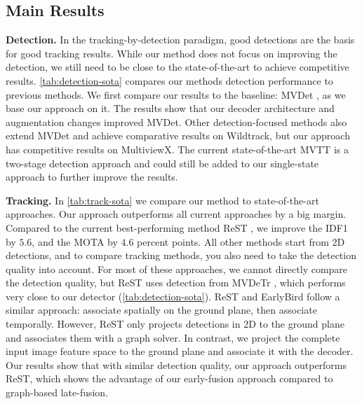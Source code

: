 \documentclass[10pt,twocolumn,letterpaper]{article}
\newcommand{\nparagraph}[1]{\noindent\textbf{#1.  }}
\def\sname{EarlyBird\xspace}
\begin{document}
\subsection{Main Results}

\nparagraph{Detection} In the tracking-by-detection paradigm, good detections are the basis for good tracking results. While our method does not focus on improving the detection, we still need to be close to the state-of-the-art to achieve competitive results. \cref{tab:detection-sota} compares our methods detection performance to previous methods. We first compare our results to the baseline: MVDet \cite{hou2020multiview}, as we base our approach on it. The results show that our decoder architecture and augmentation changes improved MVDet. Other detection-focused methods \cite{hou2021multiview, lee2023multi, song2021stacked} also extend MVDet and achieve comparative results on Wildtrack, but our approach has competitive results on MultiviewX. The current state-of-the-art MVTT \cite{lee2023multi} is a two-stage detection approach and could still be added to our single-state approach to further improve the results.

\nparagraph{Tracking} In \cref{tab:track-sota} we compare our method to state-of-the-art approaches. Our approach outperforms all current approaches by a big margin. Compared to the current best-performing method ReST \cite{cheng2023rest}, we improve the IDF1 by $5.6$, and the MOTA by $4.6$ percent points. All other methods \cite{chavdarova2018wildtrack, nguyen2022lmgp, ong2020bayesian, you2020real, cheng2023rest} start from 2D detections, and to compare tracking methods, you also need to take the detection quality into account. For most of these approaches, we cannot directly compare the detection quality, but ReST \cite{cheng2023rest} uses detection from MVDeTr \cite{hou2021multiview}, which performs very close to our detector (\cf \cref{tab:detection-sota}). ReST and \sname follow a similar approach: associate spatially on the ground plane, then associate temporally. However, ReST only projects detections in 2D to the ground plane and associates them with a graph solver. In contrast, we project the complete input image feature space to the ground plane and associate it with the decoder. Our results show that with similar detection quality, our approach outperforms ReST, which shows the advantage of our early-fusion approach compared to graph-based late-fusion.
\end{document}
